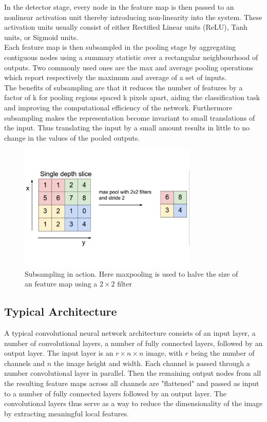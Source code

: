 \noindent In the detector stage, every node in the feature map is then passed to an nonlinear activation unit thereby introducing non-linearity into the system. These activation units usually consist of either Rectified Linear units (ReLU), Tanh units, or Sigmoid units.\\

\noindent Each feature map is then subsampled in the pooling stage by aggregating contiguous nodes using a summary statistic over a rectangular neighbourhood of outputs. Two commonly used ones are the max and average pooling operations which report respectively the maximum and average of a set of inputs.\\

\noindent The benefits of subsampling are that it reduces the number of features by a factor of k for pooling regions spaced k pixels apart, aiding the classification task and improving the computational efficiency of the network. Furthermore subsampling makes the representation become invariant to small translations of the input. Thus translating the input by a small amount results in little to no change in the values of the pooled outputs.\\

\begin{figure}
\centering
\includegraphics[trim=0cm 0cm 0cm 0cm, clip=true, height=60mm]{Chapter1/pooling.pdf}
\caption{Subsampling in action. Here maxpooling is used to halve the size of an feature map using a $2 \times 2$ filter}
\end{figure}

\subsection{Typical Architecture}

\noindent A typical convolutional neural network architecture consists of an input layer, a number of convolutional layers, a number of fully connected layers, followed by an output layer. The input layer is an $r \times n \times n$ image, with $r$ being the number of channels and $n$ the image height and width. Each channel is passed through a number convolutional layer in parallel. Then the remaining output nodes from all the resulting feature maps across all channels are "flattened" and passed as input to a number of fully connected layers followed by an output layer. The convolutional layers thus serve as a way to reduce the dimensionality of the image by extracting meaningful local features.

